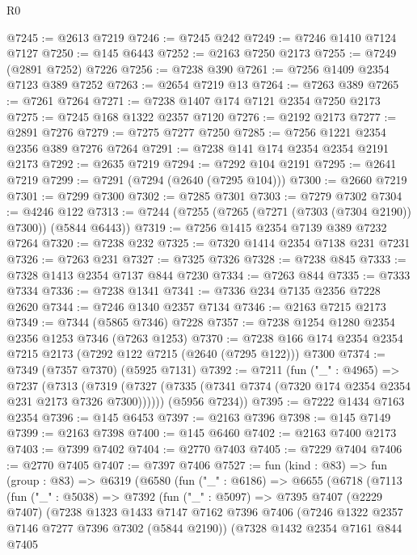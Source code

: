 \begin{lexlean}{R0}
\begin{coremodule}
@7245 := @2613 @7219
@7246 := @7245 @242
@7249 := @7246 @1410 @7124 @7127
@7250 := @145 @6443
@7252 := @2163 @7250 @2173
@7255 := @7249 (@2891 @7252) @7226
@7256 := @7238 @390
@7261 := @7256 @1409 @2354 @7123 @389 @7252
@7263 := @2654 @7219 @13
@7264 := @7263 @389
@7265 := @7261 @7264
@7271 := @7238 @1407 @174 @7121 @2354 @7250 @2173
@7275 := @7245 @168 @1322 @2357 @7120
@7276 := @2192 @2173
@7277 := @2891 @7276
@7279 := @7275 @7277 @7250
@7285 := @7256 @1221 @2354 @2356 @389 @7276 @7264
@7291 := @7238 @141 @174 @2354 @2354 @2191 @2173
@7292 := @2635 @7219
@7294 := @7292 @104 @2191
@7295 := @2641 @7219
@7299 := @7291 (@7294 (@2640 (@7295 @104)))
@7300 := @2660 @7219
@7301 := @7299 @7300
@7302 := @7285 @7301
@7303 := @7279 @7302
@7304 := @4246 @122
@7313 := @7244 (@7255 (@7265 (@7271 (@7303 (@7304 @2190)) @7300)) (@5844 @6443))
@7319 := @7256 @1415 @2354 @7139 @389 @7232 @7264
@7320 := @7238 @232
@7325 := @7320 @1414 @2354 @7138 @231 @7231
@7326 := @7263 @231
@7327 := @7325 @7326
@7328 := @7238 @845
@7333 := @7328 @1413 @2354 @7137 @844 @7230
@7334 := @7263 @844
@7335 := @7333 @7334
@7336 := @7238 @1341
@7341 := @7336 @234 @7135 @2356 @7228 @2620
@7344 := @7246 @1340 @2357 @7134
@7346 := @2163 @7215 @2173
@7349 := @7344 (@5865 @7346) @7228
@7357 := @7238 @1254 @1280 @2354 @2356 @1253 @7346 (@7263 @1253)
@7370 := @7238 @166 @174 @2354 @2354 @7215 @2173 (@7292 @122 @7215 (@2640 (@7295 @122))) @7300
@7374 := @7349 (@7357 @7370) (@5925 @7131)
@7392 := @7211
    (fun ("_" : @4965) =>
    @7237
      (@7313 (@7319 (@7327 (@7335 (@7341 @7374 (@7320 @174 @2354 @2354 @231 @2173 @7326 @7300))))))
      (@5956 @7234))
@7395 := @7222 @1434 @7163 @2354
@7396 := @145 @6453
@7397 := @2163 @7396
@7398 := @145 @7149
@7399 := @2163 @7398
@7400 := @145 @6460
@7402 := @2163 @7400 @2173
@7403 := @7399 @7402
@7404 := @2770 @7403
@7405 := @7229 @7404
@7406 := @2770 @7405
@7407 := @7397 @7406
@7527 := fun (kind : @83) =>
  fun (group : @83) =>
  @6319
    (@6580
      (fun ("_" : @6186) =>
      @6655
        (@6718
          (@7113
            (fun ("_" : @5038) =>
            @7392
              (fun ("_" : @5097) =>
              @7395
                @7407
                (@2229 @7407)
                (@7238
                  @1323
                  @1433
                  @7147
                  @7162
                  @7396
                  @7406
                  (@7246 @1322 @2357 @7146 @7277 @7396 @7302 (@5844 @2190))
                  (@7328
                    @1432
                    @2354
                    @7161
                    @844
                    @7405

\end{coremodule}
\end{lexlean}
